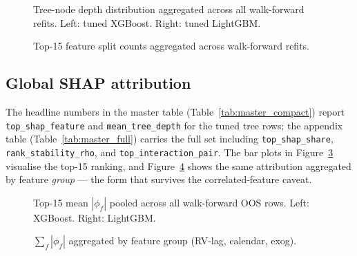\begin{figure}[H]
\centering
\hfill
{}
\caption{Tree-node depth distribution aggregated across all walk-forward
refits. Left: tuned XGBoost. Right: tuned LightGBM.}
\label{fig:tree_depth_histogram}
\end{figure}

\begin{figure}[H]
\centering
\hfill
{}
\caption{Top-15 feature split counts aggregated across walk-forward
refits.}
\label{fig:feature_split_count}
\end{figure}

\subsection{Global SHAP attribution}
\label{sec:tree_story_global}

The headline numbers in the master table
(Table~\ref{tab:master_compact}) report
\texttt{top\_shap\_feature} and \texttt{mean\_tree\_depth} for the
tuned tree rows; the appendix table
(Table~\ref{tab:master_full}) carries the full set including
\texttt{top\_shap\_share}, \texttt{rank\_stability\_rho}, and
\texttt{top\_interaction\_pair}. The bar plots in
Figure~\ref{fig:shap_summary} visualise the top-15 ranking, and
Figure~\ref{fig:shap_group} shows the same attribution aggregated by
feature \emph{group} --- the form that survives the correlated-feature
caveat.

\begin{figure}[H]
\centering
\hfill
{}
\caption{Top-15 mean $|\phi_f|$ pooled across all walk-forward OOS rows.
Left: XGBoost. Right: LightGBM.}
\label{fig:shap_summary}
\end{figure}

\begin{figure}[H]
\centering
\hfill
{}
\caption{$\sum_f |\phi_f|$ aggregated by feature group (RV-lag,
calendar, exog).}
\label{fig:shap_group}
\end{figure}

